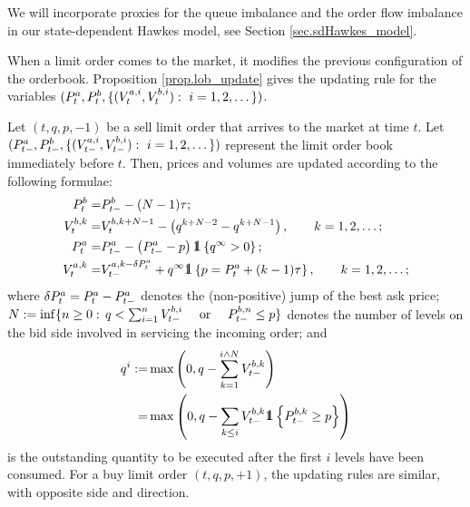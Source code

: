 \documentclass[10pt, article,table]{article}
\begin{document}
We will incorporate proxies for the queue imbalance and the order flow imbalance in our state-dependent Hawkes model, see Section \ref{sec.sdHawkes_model}.

When a limit order comes to the market, it modifies the previous configuration of the orderbook. Proposition \ref{prop.lob_update} gives the updating rule for the variables $(\bestAskPrice_t, \bestBidPrice_t, \lbrace (\nthBestAskVolume[i]_t, \nthBestBidVolume[i]_t) : \, \, i=1,2,\dots\rbrace)$.
\begin{prop}\label{prop.lob_update}
 Let $(t,q,p,-1)$ be a sell limit order that arrives to the market at time $t$. Let $(\bestAskPrice_{t-}, \bestBidPrice_{t-},\lbrace  (\nthBestAskVolume[i]_{t-}, \nthBestBidVolume[i]_{t-}) : \, \, i=1,2,\dots\rbrace )$ represent the limit order book immediately before $t$. Then, prices and volumes are updated according to the following formulae:
 \begin{equation}\label{eq.lob_update_sell_order}
  \begin{split}
   \bestBidPrice_t =& \bestBidPrice_{t-} - (N-1)\tickSizeOfLOB;
   \\
   \nthBestBidVolume[k]_{t} 
   =& \nthBestBidVolume[k+N-1]_{t} 
   - \left( q^{k+N-2}-q^{k+N-1}\right), \qquad k=1,2,\dots ; 
   \\
   \bestAskPrice_t = & \bestAskPrice_{t-} 
   - \left(\bestAskPrice_{t-} - p\right) \one\left\lbrace q^{\infty} > 0\right\rbrace ; 
   \\
   \nthBestAskVolume[k]_t = &  \nthBestAskVolume[k-\delta\bestAskPrice_t]_{t-}
   +q^{\infty}\one\left\lbrace p=\bestAskPrice_t + (k-1)\tickSizeOfLOB \right\rbrace, \qquad k=1,2,\dots ;
  \end{split}
 \end{equation}
 where $\delta\bestAskPrice_t = \bestAskPrice_t - \bestAskPrice_{t-}$ denotes the (non-positive) jump of the best ask price;  $N := \inf\lbrace n\geq 0 : \, q<\sum_{i=1}^{n} \nthBestBidVolume[i]_{t-} \quad \text{ or } \quad  \nthBestBidPrice[n]_{t-}\leq p \rbrace$ denotes the number of levels on the bid side involved in servicing the incoming order; and 
 \begin{equation*}
  \begin{split}
   q^{i}:=& \max\left( 0, 
   q-\sum_{k=1}^{i\wedge N} \nthBestBidVolume[k]_{t-}
   \right)
   \\
   =& \max\left( 0, 
   q-\sum_{k\leq i} \nthBestBidVolume[k]_{t-}\one\left\lbrace \nthBestBidPrice[k]_{t-} \geq p\right\rbrace
   \right)
  \end{split}
 \end{equation*}
 is the outstanding quantity to be executed after the first $i$ levels have been consumed. 
 For a buy limit order  $(t,q,p,+1)$, the updating rules are similar, with opposite side and direction. 
\end{prop}
\end{document}
